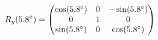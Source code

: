 \documentclass[preview]{standalone}
\begin{document}
\begin{align*}
\special{dvisvgm:raw <g id='unique000'>}R_y(5.8^\circ) = \begin{pmatrix} \cos(5.8^\circ) & 0 & -\sin(5.8^\circ) \\ 0 & 1 & 0 \\ \sin(5.8^\circ) & 0 & \cos(5.8^\circ) \end{pmatrix}\special{dvisvgm:raw </g>}
\end{align*}
\end{document}
